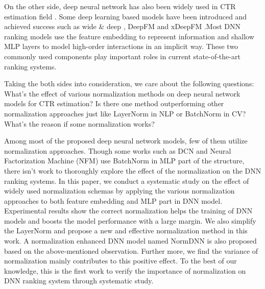 \documentclass[sigconf]{acmart}
\begin{document}
On the other side, deep neural network has also been widely used in CTR estimation field \cite{10.1145/2487575.2488200,zhou2018deep,he2014practical,xiao2017attentional,qu2016product,he2017neural,zhang2016deep,cheng2016wide,guo2017deepfm,lian2018xdeepfm,beutel2018latent,huang2019fibinet,zhang2019fat}. Some deep learning based models have been introduced and achieved success such as wide \& deep \cite{cheng2016wide}, DeepFM\cite{guo2017deepfm} and xDeepFM\cite{lian2018xdeepfm} .Most DNN ranking models  use the feature embedding to represent information and shallow MLP layers to model high-order interactions in an implicit way. These two commonly used components play important roles in current state-of-the-art ranking systems.



Taking the both sides into consideration, we care about the following questions: What's the effect of various normalization methods on deep neural network models for CTR estimation? Is there one method outperforming other normalization approaches just like LayerNorm in NLP or BatchNorm in CV? What's the reason if some normalization works?


Among most of the proposed deep neural network models, few of them utilize normalization approaches. Though some  works such as DCN\cite{wang2017deep} and Neural Factorization Machine (NFM) \cite{he2017neural} use BatchNorm in MLP part of the structure,  there isn't work  to thoroughly explore the effect of the normalization on the DNN ranking systems. In this paper, we conduct a systematic study on the effect of widely used normalization schemas by applying the various normalization approaches to both feature embedding and MLP part in DNN model.  Experimental results show the correct normalization helps the training of DNN models and boosts the model performance with a large margin. We also simplify the LayerNorm and propose a new and effective normalization method in this work. A normalization enhanced DNN model named NormDNN is also proposed based on the above-mentioned observation. Further more, we find the variance of normalization mainly contributes to this positive effect. To the best of our knowledge, this is the first work to verify the importance of normalization on DNN ranking system through systematic study.
\end{document}
